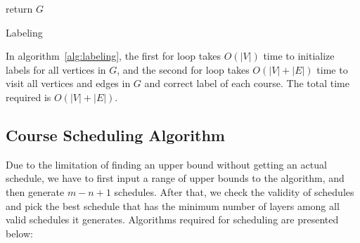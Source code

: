 \documentclass[letterpaper,12pt]{article}
\theoremstyle{definition}
\begin{document}
\begin{algorithm}[H]
return $G$

\caption{Labeling}\label{alg:labeling}

\end{algorithm}
\bigskip
In algorithm~\ref{alg:labeling}, the first for loop takes $O(|V|)$ time to initialize labels for all vertices in $G$, and the second for loop takes $O(|V|+|E|)$ time to visit all vertices and edges in $G$ and correct label of each course. The total time required is $O(|V|+|E|)$.

\subsection{Course Scheduling Algorithm}
Due to the limitation of finding an upper bound without getting an actual schedule, we have to first input a range of upper bounds to the algorithm, and then generate $m-n+1$ schedules. After that, we check the validity of schedules and pick the best schedule that has the minimum number of layers among all valid schedules it generates. Algorithms required for scheduling are presented below: 
\end{document}
